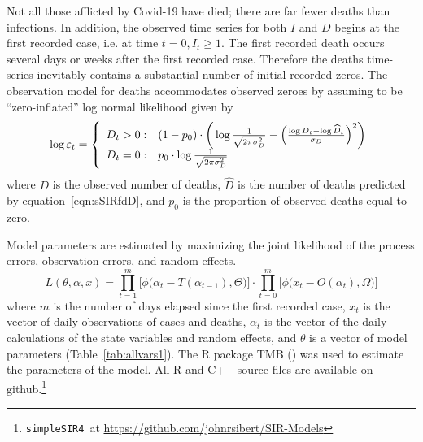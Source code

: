 \documentclass[12pt,letterpaper]{article}
\newcommand\SSm{{\tt simpleSIR4}}
\begin{document}
Not all those afflicted by Covid-19 have died; there are far fewer
deaths than infections. In addition,
the observed time series for both $I$ and $D$ begins at the first recorded
case, i.e. at time $t=0, I_t \ge 1$. The first recorded death occurs
several days or weeks after the first recorded case.
Therefore the deaths time-series inevitably contains a
substantial number of initial recorded zeros. 
The observation model for deaths accommodates observed zeroes by
assuming to be ``zero-inflated'' log normal likelihood given by
\begin{equation}
\label{eqn:ZIlogNlike}
  \log \varepsilon_t = \left\{
    \begin{array}{r@{\;:\quad}l}
       D_t > 0 &
(1-p_0)\cdot\bigg(\log\frac{1}{\sqrt{2\pi\sigma^2_D}}
          -\Bigl(\frac{\log D_t-\log\widehat{D}_t}{\sigma_D}\Bigr)^2\bigg)\\
       D_t = 0 & p_0 \cdot\log \frac{1}{\sqrt{2\pi\sigma^2_D}}\\
    \end{array}
  \right.
\end{equation}
where $D$ is the observed number of deaths,
$\widehat{D}$ is the number of deaths predicted by
equation~\ref{eqn:sSIRfdD}, 
and $p_0$ is the proportion of observed deaths equal to zero.

Model parameters are estimated by
maximizing the joint likelihood of the process errors, observation
errors, and random effects.
\begin{equation}
\label{eqn:likelihood}
L(\theta,\alpha,x)=
\prod^m_{t=1}\big[\phi\big(\alpha_t-T(\alpha_{t-1}), \Theta\big)\big]\cdot
\prod^m_{t=0}\big[\phi\big(x_t-O(\alpha_t), \Omega\big)\big]
\end{equation}
where $m$ is the number of days elapsed since the first recorded case,
$x_t$ is the vector of daily observations of cases and deaths,
$\alpha_t$ is the vector of the daily calculations of the state
variables and random effects,
and $\theta$ 
is a vector of model parameters (Table~\ref{tab:allvars1}).
The R package TMB (\cite{TMB0000}) was used to 
estimate the parameters of the model. 
All R and C++ source files are available on 
github.\footnote{\SSm~at \url{https://github.com/johnrsibert/SIR-Models}}
\end{document}
